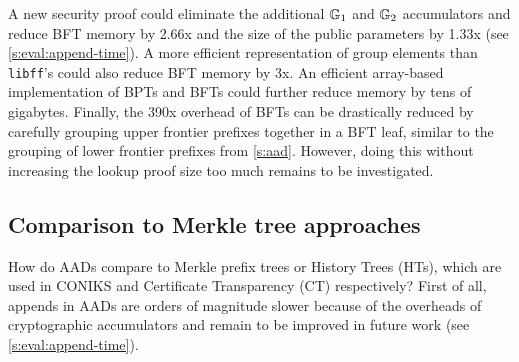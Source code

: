 A new security proof could eliminate the additional $\mathbb{G}_1$ and $\mathbb{G}_2$ accumulators and reduce BFT memory by 2.66x and the size of the public parameters by 1.33x (see \cref{s:eval:append-time}).
A more efficient representation of group elements than \texttt{libff}'s could also reduce BFT memory by 3x.
An efficient array-based implementation of BPTs and BFTs could further reduce memory by tens of gigabytes.
Finally, the 390x overhead of BFTs can be drastically reduced by carefully grouping upper frontier prefixes together in a BFT leaf, similar to the grouping of lower frontier prefixes from \cref{s:aad}.
However, doing this without increasing the lookup proof size too much remains to be investigated.

\subsection{Comparison to Merkle tree approaches}
\label{s:eval:comparison-to-merkle}

How do AADs compare to Merkle prefix trees or History Trees (HTs), which are used in CONIKS and Certificate Transparency (CT) respectively?
First of all, appends in AADs are orders of magnitude slower because of the overheads of cryptographic accumulators and remain to be improved in future work (see \cref{s:eval:append-time}).

